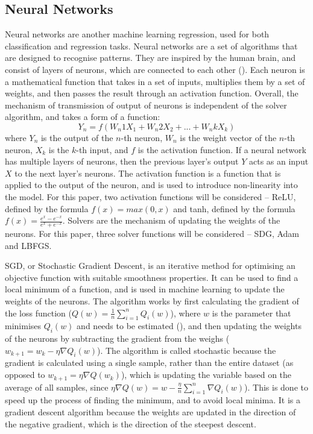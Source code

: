 \documentclass[12pt]{report}
\begin{document}
\subsection{Neural Networks}
Neural networks are another machine learning regression, used for both classification and regression tasks. Neural networks are a set of algorithms that are designed to recognise patterns. They are inspired by the human brain, and consist of layers of neurons, which are connected to each other (\cite{shi2023}). Each neuron is a mathematical function that takes in a set of inputs, multiplies them by a set of weights, and then passes the result through an activation function. Overall, the mechanism of transmission of output of neurons is independent of the solver algorithm, and takes a form of a function:
\begin{equation}
	Y_n = f(W_n1X_1 + W_n2X_2 + ... + W_nkX_k)
\end{equation}
where $Y_n$ is the output of the $n$-th neuron, $W_n$ is the weight vector of the $n$-th neuron, $X_k$ is the $k$-th input, and $f$ is the activation function. If a neural network has multiple layers of neurons, then the previous layer's output $Y$ acts as an input $X$ to the next layer's neurons. The activation function is a function that is applied to the output of the neuron, and is used to introduce non-linearity into the model. For this paper, two activation functions will be considered -- ReLU, defined by the formula $f(x) = max(0,x)$ and tanh, defined by the formula $f(x) = \frac{e^{x}-e^{-x}}{e^{x}+e^{-x}}$. Solvers are the mechanism of updating the weights of the neurons. For this paper, three solver functions will be considered -- SDG, Adam and LBFGS.

SGD, or Stochastic Gradient Descent, is an iterative method for optimising an objective function with suitable smoothness properties. It can be used to find a local minimum of a function, and is used in machine learning to update the weights of the neurons. The algorithm works by first calculating the gradient of the loss function ($Q(w)=\frac{1}{n}\sum_{i=1}^{n}Q_i(w)$), where $w$ is the parameter that minimises $Q_i(w)$ and needs to be estimated (\cite{sra2011}), and then updating the weights of the neurons by subtracting the gradient from the weighs ($w_{k+1}=w_{k}-\eta\nabla Q_i(w)$). The algorithm is called stochastic because the gradient is calculated using a single sample, rather than the entire dataset (as opposed to $w_{k+1}=\eta\nabla Q(w_k)$), which is updating the variable based on the average of all samples, since $\eta\nabla Q(w)=w-\frac{\eta}{n}\sum_{i=1}^{n}\nabla Q_i(w)$). This is done to speed up the process of finding the minimum, and to avoid local minima. It is a gradient descent algorithm because the weights are updated in the direction of the negative gradient, which is the direction of the steepest descent.
\end{document}
